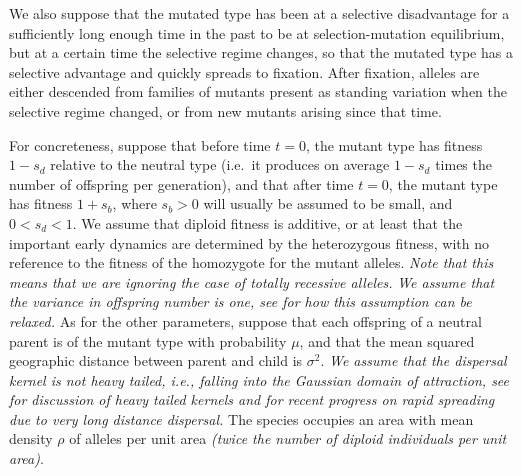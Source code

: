\documentclass{article}
\newcommand{\gc}[1]{{\it\color{blue}#1}}
\newcommand{\mfp}[1]{{\it\color{red}#1}}
\begin{document}
We also suppose that 
the mutated type has been at a selective disadvantage 
for a sufficiently long enough time in the past to be at selection-mutation equilibrium,
but at a certain time the selective regime changes, so that the mutated type has a selective advantage and quickly spreads to fixation.
After fixation, alleles are either descended
from families of mutants present as standing variation when the selective regime changed,
or from new mutants arising since that time.

For concreteness, suppose that before time $t=0$,
the mutant type has fitness $1-s_d$ relative to the neutral type
(i.e.\ it produces on average $1-s_d$ times the number of offspring per generation),
and that after time $t=0$,
the mutant type has fitness $1+s_b$,
where $s_b>0$ will usually be assumed to be small, and $0<s_d<1$.
We assume that diploid fitness is additive, or at least that the
important early dynamics are determined by the heterozygous fitness, with no reference to the fitness of the
homozygote for the mutant alleles. \mfp{Note that this means that we
  are ignoring the case of totally recessive alleles.}
\gc{We assume that the variance in offspring number is one, see
  \cite{ralphcoop2010} for how this assumption can be relaxed.}
As for the other parameters,
suppose that each offspring of a neutral parent is of the mutant type with probability $\mu$,
and that the mean squared geographic distance between parent and child
is $\sigma^2$. \mfp{We assume that the dispersal kernel is
  not heavy tailed, i.e., falling into the Gaussian domain of attraction, see \citet{ralphcoop2010} for
  discussion of heavy tailed kernels and \citet{hallatschek_acceleration_2014} for recent progress
  on rapid spreading due to very long distance dispersal.}
The species occupies an area with mean density
$\rho$ of alleles per unit area \gc{(twice the number of diploid
  individuals per unit area)}.


\end{document}
